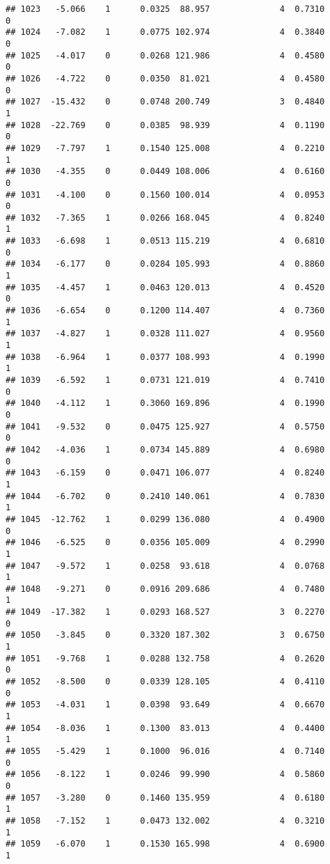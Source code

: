 \documentclass[
]{article}
\begin{document}
\begin{verbatim}
## 1023   -5.066    1      0.0325  88.957              4  0.7310      0
## 1024   -7.082    1      0.0775 102.974              4  0.3840      0
## 1025   -4.017    0      0.0268 121.986              4  0.4580      0
## 1026   -4.722    0      0.0350  81.021              4  0.4580      0
## 1027  -15.432    0      0.0748 200.749              3  0.4840      1
## 1028  -22.769    0      0.0385  98.939              4  0.1190      0
## 1029   -7.797    1      0.1540 125.008              4  0.2210      1
## 1030   -4.355    0      0.0449 108.006              4  0.6160      0
## 1031   -4.100    0      0.1560 100.014              4  0.0953      0
## 1032   -7.365    1      0.0266 168.045              4  0.8240      1
## 1033   -6.698    1      0.0513 115.219              4  0.6810      0
## 1034   -6.177    0      0.0284 105.993              4  0.8860      1
## 1035   -4.457    1      0.0463 120.013              4  0.4520      0
## 1036   -6.654    0      0.1200 114.407              4  0.7360      1
## 1037   -4.827    1      0.0328 111.027              4  0.9560      1
## 1038   -6.964    1      0.0377 108.993              4  0.1990      1
## 1039   -6.592    1      0.0731 121.019              4  0.7410      0
## 1040   -4.112    1      0.3060 169.896              4  0.1990      0
## 1041   -9.532    0      0.0475 125.927              4  0.5750      0
## 1042   -4.036    1      0.0734 145.889              4  0.6980      0
## 1043   -6.159    0      0.0471 106.077              4  0.8240      1
## 1044   -6.702    0      0.2410 140.061              4  0.7830      1
## 1045  -12.762    1      0.0299 136.080              4  0.4900      0
## 1046   -6.525    0      0.0356 105.009              4  0.2990      1
## 1047   -9.572    1      0.0258  93.618              4  0.0768      1
## 1048   -9.271    0      0.0916 209.686              4  0.7480      1
## 1049  -17.382    1      0.0293 168.527              3  0.2270      0
## 1050   -3.845    0      0.3320 187.302              3  0.6750      1
## 1051   -9.768    1      0.0288 132.758              4  0.2620      0
## 1052   -8.500    0      0.0339 128.105              4  0.4110      0
## 1053   -4.031    1      0.0398  93.649              4  0.6670      1
## 1054   -8.036    1      0.1300  83.013              4  0.4400      1
## 1055   -5.429    1      0.1000  96.016              4  0.7140      0
## 1056   -8.122    1      0.0246  99.990              4  0.5860      0
## 1057   -3.280    0      0.1460 135.959              4  0.6180      1
## 1058   -7.152    1      0.0473 132.002              4  0.3210      1
## 1059   -6.070    1      0.1530 165.998              4  0.6900      1

\end{verbatim}
\end{document}
